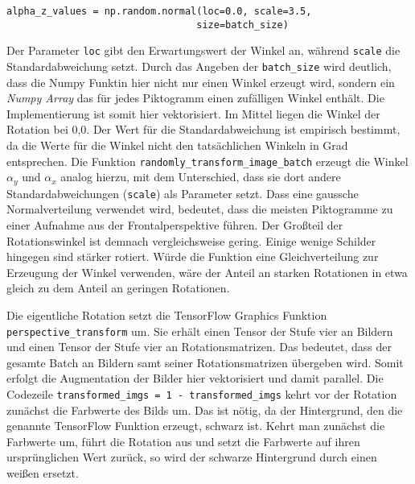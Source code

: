 \begin{code}
   \begin{verbatim}
alpha_z_values = np.random.normal(loc=0.0, scale=3.5, 
                                 size=batch_size)
\end{verbatim}
   \label{lst:alpha-z-value}
   \end{code}

Der Parameter \texttt{loc} gibt den Erwartungswert der Winkel an, während \texttt{scale} die Standardabweichung setzt. Durch das Angeben der \texttt{batch_size} wird deutlich, dass die Numpy Funktin hier nicht nur einen Winkel erzeugt wird, sondern ein \emph{Numpy Array} das für jedes Piktogramm einen zufälligen Winkel enthält. Die Implementierung ist somit hier vektorisiert. Im Mittel liegen die Winkel der Rotation bei 0,0\textdegree. Der Wert für die Standardabweichung ist empirisch bestimmt, da die Werte für die Winkel nicht den tatsächlichen Winkeln in Grad entsprechen. Die Funktion \texttt{randomly_transform_image_batch} erzeugt die Winkel $\alpha_y$ und $\alpha_x$ analog hierzu, mit dem Unterschied, dass sie dort andere Standardabweichungen (\texttt{scale}) als Parameter setzt. Dass eine gaussche Normalverteilung verwendet wird, bedeutet, dass die meisten Piktogramme zu einer Aufnahme aus der Frontalperspektive führen. Der Großteil der Rotationswinkel ist demnach vergleichsweise gering. Einige wenige Schilder hingegen sind stärker rotiert. Würde die Funktion eine Gleichverteilung zur Erzeugung der Winkel verwenden, wäre der Anteil an starken Rotationen in etwa gleich zu dem Anteil an geringen Rotationen.

Die eigentliche Rotation setzt die TensorFlow Graphics Funktion \texttt{perspective_transform} um. Sie erhält einen Tensor der Stufe vier an Bildern und einen Tensor der Stufe vier an Rotationsmatrizen. Das bedeutet, dass der gesamte Batch an Bildern samt seiner Rotationsmatrizen übergeben wird. Somit erfolgt die Augmentation der Bilder hier vektorisiert und damit parallel. Die Codezeile \texttt{transformed_imgs = 1 - transformed_imgs} kehrt vor der Rotation zunächst die Farbwerte des Bilds um. Das ist nötig, da der Hintergrund, den die genannte TensorFlow Funktion erzeugt, schwarz ist. Kehrt man zunächst die Farbwerte um, führt die Rotation aus und setzt die Farbwerte auf ihren ursprünglichen Wert zurück, so wird der schwarze Hintergrund durch einen weißen ersetzt.
